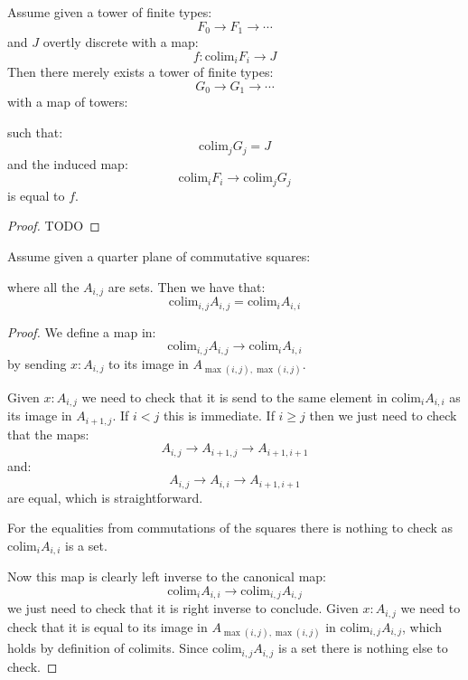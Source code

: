 \begin{lemma}\label{presentation-maps-overtly-discrete}
Assume given a tower of finite types:
\[F_0\to F_1\to \cdots\]
and $J$ overtly discrete with a map:
\[f:\mathrm{colim}_iF_i\to J\]
Then there merely exists a tower of finite types:
\[G_0\to G_1\to \cdots\]
with a map of towers:
\begin{center}
\end{center}
such that:
\[\mathrm{colim}_jG_j = J\]
and the induced map:
\[\mathrm{colim}_iF_i \to \mathrm{colim}_jG_j\]
is equal to $f$.
\end{lemma}

\begin{proof}
TODO
\end{proof}

\begin{lemma}\label{colimit-quarter-diagonal}
Assume given a quarter plane of commutative squares:
\begin{center}
\end{center}
where all the $A_{i,j}$ are sets. Then we have that:
\[\mathrm{colim}_{i,j} A_{i,j} = \mathrm{colim}_iA_{i,i}\]
\end{lemma}

\begin{proof}
We define a map in:
\[\mathrm{colim}_{i,j} A_{i,j} \to \mathrm{colim}_iA_{i,i}\]
by sending $x:A_{i,j}$ to its image in $A_{\max(i,j),\max(i,j)}$.

Given $x:A_{i,j}$ we need to check that it is send to the same element in $\mathrm{colim}_iA_{i,i}$ as its image in $A_{i+1,j}$. If $i<j$ this is immediate. If $i\geq j$ then we just need to check that the maps:
\[A_{i,j} \to A_{i+1,j} \to A_{i+1,i+1}\]
and:
\[A_{i,j}\to A_{i,i}\to A_{i+1,i+1}\]
are equal, which is straightforward.

For the equalities from commutations of the squares there is nothing to check as $\mathrm{colim}_iA_{i,i}$ is a set.

Now this map is clearly left inverse to the canonical map:
\[ \mathrm{colim}_iA_{i,i}\to\mathrm{colim}_{i,j} A_{i,j} \]
we just need to check that it is right inverse to conclude. Given $x:A_{i,j}$ we need to check that it is equal to its image in $A_{\max(i,j),\max(i,j)}$ in $\mathrm{colim}_{i,j} A_{i,j}$, which holds by definition of colimits. Since $\mathrm{colim}_{i,j} A_{i,j}$ is a set there is nothing else to check.
\end{proof}

